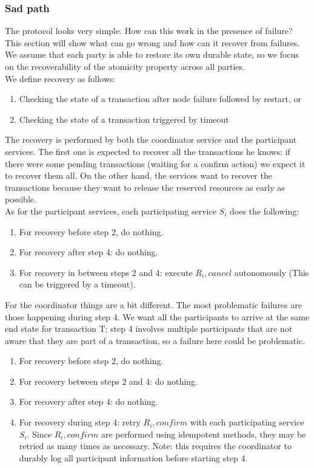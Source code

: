 \subsubsection{Sad path}
The protocol looks very simple. How can this work in the presence of failure? This section will show what can go wrong and how can it recover from failures. We assume that each party is able to restore its own durable state, so we focus on the recoverability of the atomicity property across all parties.\\
We define recovery as follows:
\begin{enumerate}
\item Checking the state of a transaction after node failure followed by restart, or
\item Checking the state of a transaction triggered by timeout
\end{enumerate}
The recovery is performed by both the coordinator service and the participant services. The first one is expected to recover all the transactions he knows: if there were some pending transactions (waiting for a confirm action) we expect it to recover them all. On the other hand, the services want to recover the transactions because they want to release the reserved resources as early as possible.\\
As for the participant services, each participating service $S_i$ does the following:\\
\begin{enumerate}
\item For recovery before step 2, do nothing. 
\item For recovery after step 4: do nothing. 
\item For recovery in between steps 2 and 4: execute $R_i,cancel$ autonomously (This can be triggered by a timeout).
\end{enumerate}

For the coordinator things are a bit different. The most problematic failures are those happening during step 4. We want all the participants to arrive at the same end state for transaction T; step 4 involves multiple participants that are not aware that they are part of a transaction, so a failure here could be problematic.
\begin{enumerate}
\item For recovery before step 2, do nothing. 
\item For recovery between steps 2 and 4: do nothing. 
\item For recovery after step 4: do nothing. 
\item For recovery during step 4: retry $R_i,confirm$ with each participating service $S_i$. Since $R_i,confirm$ are performed using idempotent methods, they may be retried as many times as necessary. Note: this requires the coordinator to durably log all participant information before starting step 4.
\end{enumerate}

